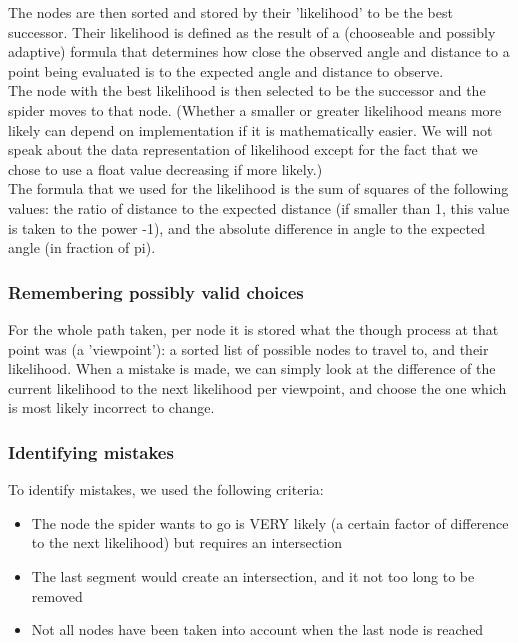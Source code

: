 \documentclass[11pt]{article}
\begin{document}
The nodes are then sorted and stored by their 'likelihood' to be the best successor. Their likelihood is defined as the result of a (chooseable and possibly adaptive) formula that determines how close the observed angle and distance to a point being evaluated is to the expected angle and distance to observe.\\

The node with the best likelihood is then selected to be the successor and the spider moves to that node. (Whether a smaller or greater likelihood means more likely can depend on implementation if it is mathematically easier. We will not speak about the data representation of likelihood except for the fact that we chose to use a float value decreasing if more likely.)\\

The formula that we used for the likelihood is the sum of squares of the following values: the ratio of distance to the expected distance (if smaller than 1, this value is taken to the power -1), and the absolute difference in angle to the expected angle (in fraction of pi).\\

\subsubsection{Remembering possibly valid choices} 

For the whole path taken, per node it is stored what the though process at that point was (a 'viewpoint'): a sorted list of possible nodes to travel to, and their likelihood. When a mistake is made, we can simply look at the difference of the current likelihood to the next likelihood per viewpoint, and choose the one which is most likely incorrect to change.\\

\subsubsection{Identifying mistakes} 

To identify mistakes, we used the following criteria:
\begin{itemize}
\item The node the spider wants to go is VERY likely (a certain factor of difference to the next likelihood) but requires an intersection
\item The last segment would create an intersection, and it not too long to be removed
\item Not all nodes have been taken into account when the last node is reached
\end{itemize}
\end{document}
